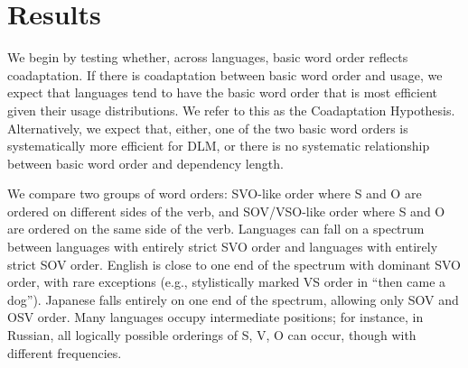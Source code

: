 \documentclass[11pt,a4paper]{article}
\newcommand\mhahn[1]{{\color{red}(#1)}}
\begin{document}















\section*{Results}
We begin by testing whether, across languages, basic word order reflects coadaptation.
If there is coadaptation between basic word order and usage, we expect that languages tend to have the basic word order that is most efficient given their usage distributions.
We refer to this as the Coadaptation Hypothesis.
Alternatively, we expect that, either, one of the two basic word orders is systematically more efficient for DLM, or there is no systematic relationship between basic word order and dependency length.




We compare two groups of word orders: SVO-like order where S and O are ordered on different sides of the verb, and SOV/VSO-like order where S and O are ordered on the same side of the verb.
Languages can fall on a spectrum between languages with entirely strict SVO order and languages with entirely strict SOV order.
English is close to one end of the spectrum with dominant SVO order, with rare exceptions (e.g., stylistically marked VS order in ``then came a dog'').
Japanese falls entirely on one end of the spectrum, allowing only SOV and OSV order.
Many languages occupy intermediate positions; for instance, in Russian, all logically possible orderings of S, V, O can occur, though with different frequencies.
\end{document}
